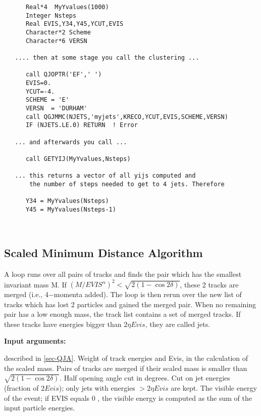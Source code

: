 \begin{verbatim}
      Real*4  MyYvalues(1000)
      Integer Nsteps
      Real EVIS,Y34,Y45,YCUT,EVIS
      Character*2 Scheme
      Character*6 VERSN

   .... then at some stage you call the clustering ...

      call QJOPTR('EF',' ')
      EVIS=0.
      YCUT=-4.
      SCHEME = 'E'
      VERSN  = 'DURHAM'
      call QGJMMC(NJETS,'myjets',KRECO,YCUT,EVIS,SCHEME,VERSN)
      IF (NJETS.LE.0) RETURN  ! Error

   ... and afterwards you call ...

      call GETYIJ(MyYvalues,Nsteps)

   ... this returns a vector of all yijs computed and
       the number of steps needed to get to 4 jets. Therefore

      Y34 = MyYvalues(Nsteps)
      Y45 = MyYvalues(Nsteps-1)

  
\end{verbatim}

 
\subsection{\label{sec-QJMD}Scaled Minimum Distance Algorithm}
\par
{}
\par
\par
A loop runs over all pairs of tracks and finds the pair which has
the
smallest invariant mass M.
If $
(M/EVIS^{\alpha })^{2}<{\sqrt {2(1-\cos 2\delta )}}
$,
these 2 tracks are merged (i.e., 4$-$momenta added).
The loop is then rerun over the new list of tracks which has lost
2 particles and gained the merged pair. When no remaining pair has
a
low enough mass, the track list contains a set of merged
tracks. If these tracks have energies bigger than $
2\eta Evis
$,
they are called jets.
\par
{\bf Input arguments:}
\begin{indentlist}{ 2.50cm}{ 2.75cm}
described in \ref{sec-QJA}.
Weight of track energies and Evis, in the calculation
of
the scaled mass.
Pairs of tracks are merged if their scaled mass is smaller
than $
{\sqrt {2(1-\cos 2\delta )}}
$.
Half opening angle cut in degrees.
Cut on jet energies (fraction of $
2Evis
$);
only jets with energies $
>2\eta Evis
$ are kept.
The visible energy of the event;
if EVIS equals 0 , the visible energy is computed as the sum of the
input particle energies.
\end{indentlist}
 
